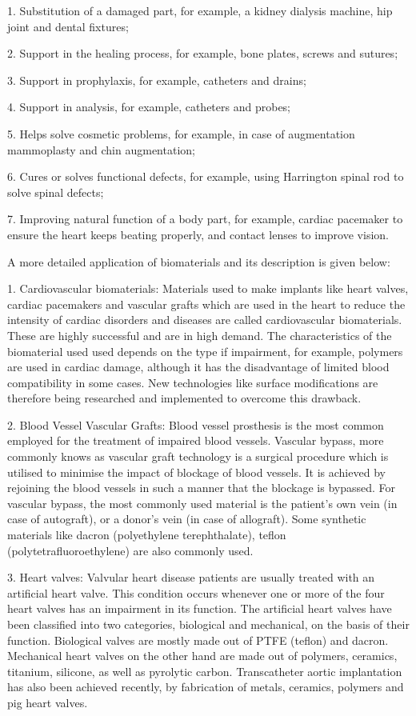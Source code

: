 \documentclass[11pt]{article}
\begin{document}
1. Substitution of a damaged part, for example, a kidney dialysis machine, hip joint and dental fixtures;

2. Support in the healing process, for example, bone plates, screws and sutures;

3. Support in prophylaxis, for example, catheters and drains;

4. Support in analysis, for example, catheters and probes;

5. Helps solve cosmetic problems, for example, in case of augmentation mammoplasty and chin augmentation;

6. Cures or solves functional defects, for example, using Harrington spinal rod to solve spinal defects;

7. Improving natural function of a body part, for example, cardiac pacemaker to ensure the heart keeps beating properly, and contact lenses to improve vision.

A more detailed application of biomaterials and its description is given below:

1. Cardiovascular biomaterials: Materials used to make implants like heart valves, cardiac pacemakers and vascular grafts which are used in the heart to reduce the intensity of cardiac disorders and diseases are called cardiovascular biomaterials. These are highly successful and are in high demand. The characteristics of the biomaterial used used depends on the type if impairment, for example, polymers are used in cardiac damage, although it has the disadvantage of limited blood compatibility in some cases. New technologies like surface modifications are therefore being researched and implemented to overcome this drawback.

2. Blood Vessel Vascular Grafts: Blood vessel prosthesis is the most common employed for the treatment of impaired blood vessels. Vascular bypass, more commonly knows as vascular graft technology is a surgical procedure which is utilised to minimise the impact of blockage of blood vessels. It is achieved by rejoining the blood vessels in such a manner that the blockage is bypassed. For vascular bypass, the most commonly used material is the patient's own vein (in case of autograft), or a donor's vein (in case of allograft). Some synthetic materials like dacron (polyethylene terephthalate), teflon (polytetrafluoroethylene) are also commonly used.

3. Heart valves: Valvular heart disease patients are usually treated with an artificial heart valve. This condition occurs whenever one or more of the four heart valves has an impairment in its function. The artificial heart valves have been classified into two categories, biological and mechanical, on the basis of their function. Biological valves are mostly made out of PTFE (teflon) and dacron. Mechanical heart valves on the other hand are made out of polymers, ceramics, titanium, silicone, as well as pyrolytic carbon. Transcatheter aortic implantation has also been achieved recently, by fabrication of metals, ceramics, polymers and pig heart valves.
\end{document}

